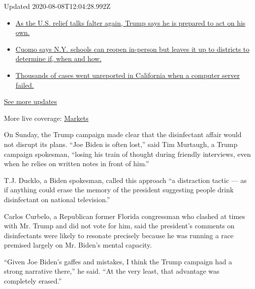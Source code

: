 Updated 2020-08-08T12:04:28.992Z

\begin{itemize}
\tightlist
\item
  \href{https://www.nytimes.com/2020/08/07/world/covid-19-news.html?action=click\&pgtype=Article\&state=default\&region=MAIN_CONTENT_1\&context=storylines_live_updates\#link-1f86d03a}{As
  the U.S. relief talks falter again, Trump says he is prepared to act
  on his own.}
\item
  \href{https://www.nytimes.com/2020/08/07/world/covid-19-news.html?action=click\&pgtype=Article\&state=default\&region=MAIN_CONTENT_1\&context=storylines_live_updates\#link-3f64a70a}{Cuomo
  says N.Y. schools can reopen in-person but leaves it up to districts
  to determine if, when and how.}
\item
  \href{https://www.nytimes.com/2020/08/07/world/covid-19-news.html?action=click\&pgtype=Article\&state=default\&region=MAIN_CONTENT_1\&context=storylines_live_updates\#link-14e70066}{Thousands
  of cases went unreported in California when a computer server failed.}
\end{itemize}

\href{https://www.nytimes.com/2020/08/07/world/covid-19-news.html?action=click\&pgtype=Article\&state=default\&region=MAIN_CONTENT_1\&context=storylines_live_updates}{See
more updates}

More live coverage:
\href{https://www.nytimes.com/live/2020/08/07/business/stock-market-today-coronavirus?action=click\&pgtype=Article\&state=default\&region=MAIN_CONTENT_1\&context=storylines_live_updates}{Markets}

On Sunday, the Trump campaign made clear that the disinfectant affair
would not disrupt its plans. ``Joe Biden is often lost,'' said Tim
Murtaugh, a Trump campaign spokesman, ``losing his train of thought
during friendly interviews, even when he relies on written notes in
front of him.''

T.J. Ducklo, a Biden spokesman, called this approach ``a distraction
tactic --- as if anything could erase the memory of the president
suggesting people drink disinfectant on national television.''

Carlos Curbelo, a Republican former Florida congressman who clashed at
times with Mr. Trump and did not vote for him, said the president's
comments on disinfectants were likely to resonate precisely because he
was running a race premised largely on Mr. Biden's mental capacity.

``Given Joe Biden's gaffes and mistakes, I think the Trump campaign had
a strong narrative there,'' he said. ``At the very least, that advantage
was completely erased.''

